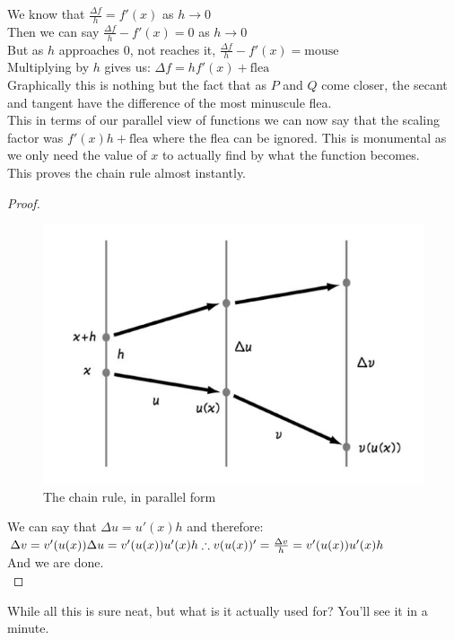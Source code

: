 We know that $\frac{\Delta f}{h}=f'(x)$ as $h \rightarrow 0$\\
Then we can say $\frac{\Delta f}{h}-f'(x)=0$ as $h \rightarrow 0$\\
But as $h$ approaches $0$, not reaches it,  $\frac{\Delta f}{h}-f'(x)= \text{mouse}$\\
Multiplying by $h$ gives us: $\Delta f = hf'(x)+ \text{flea}$\\
Graphically this is nothing but the fact that as $P$ and $Q$ come closer, the secant and tangent have the difference of the most minuscule flea.\\
This in terms of our parallel view of functions we can now say that the scaling factor was $f'(x)h+\text{flea}$ where the flea can be ignored. This is monumental as we only need the value of $x$ to actually find by what the function becomes.\\
This proves the chain rule almost instantly.\\
\begin{proof}
    \begin{figure} [h]
    \centering
    \includegraphics[width=0.5\linewidth]{Photos/Chain rule proof.png}
    \caption{The chain rule, in parallel form}
\end{figure}
We can say that $\Delta u= u'(x)h$ and therefore:\\
$\Delta v= v'(u(x))\Delta u\\
=v'(u(x))u'(x)h\\
\therefore v(u(x))'=\frac{\Delta v}{h}=v'(u(x))u'(x)h$\\
And we are done.\\
\end{proof}
While all this is sure neat, but what is it actually used for? You'll see it in a minute.\\
